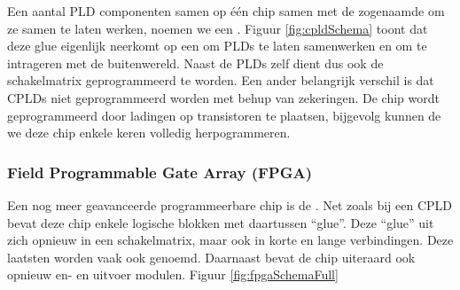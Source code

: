 Een aantal PLD componenten samen op \'e\'en chip samen met de zogenaamde  om ze samen te laten werken, noemen we een . Figuur \ref{fig:cpldSchema} toont dat deze glue eigenlijk neerkomt op een  om PLDs te laten samenwerken en  om te intrageren met de buitenwereld. Naast de PLDs zelf dient dus ook de schakelmatrix geprogrammeerd te worden. Een ander belangrijk verschil is dat CPLDs niet geprogrammeerd worden met behup van zekeringen. De chip wordt geprogrammeerd door ladingen op transistoren te plaatsen, bijgevolg kunnen de we deze chip enkele keren volledig herpogrammeren.
\subsubsection{Field Programmable Gate Array (FPGA)}
Een nog meer geavanceerde programmeerbare chip is de . Net zoals bij een CPLD bevat deze chip enkele logische blokken met daartussen ``glue''. Deze ``glue'' uit zich opnieuw in een schakelmatrix, maar ook in korte en lange verbindingen. Deze laatsten worden vaak ook  genoemd. Daarnaast bevat de chip uiteraard ook opnieuw en- en uitvoer modulen. Figuur \ref{fig:fpgaSchemaFull}
